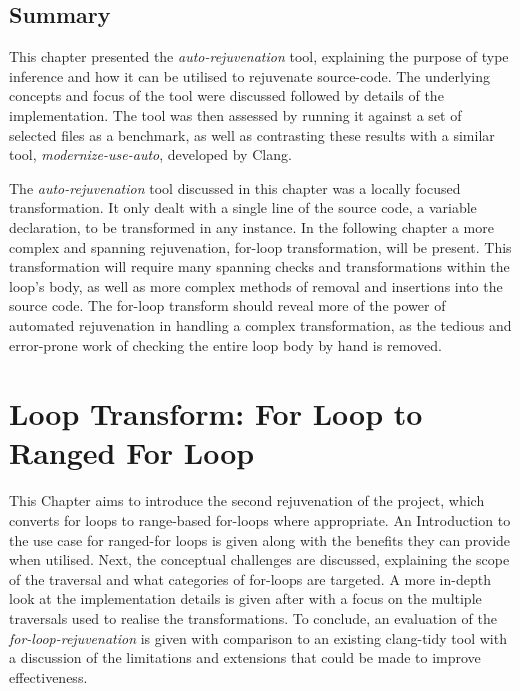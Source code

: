 \documentclass[bsc,frontabs,singlespacing,twoside,parskip,deptreport]{infthesis}
\begin{document}

\section{Summary}%
This chapter presented the \textit{auto-rejuvenation} tool, explaining the purpose of type inference and how it can be utilised to rejuvenate source-code. The underlying concepts and focus of the tool were discussed followed by details of the implementation. The tool was then assessed by running it against a set of selected files as a benchmark, as well as contrasting these results with a similar tool, \textit{modernize-use-auto}, developed by Clang. 

The \textit{auto-rejuvenation} tool discussed in this chapter was a locally focused transformation. It only dealt with a single line of the source code, a variable declaration, to be transformed in any instance. In the following chapter a more complex and spanning rejuvenation, for-loop transformation, will be present. This transformation will require many spanning checks and transformations within the loop's body, as well as more complex methods of removal and insertions into the source code. The for-loop transform should reveal more of the power of automated rejuvenation in handling a complex transformation, as the tedious and error-prone work of checking the entire loop body by hand is removed.


\chapter{Loop Transform: For Loop to Ranged For Loop}\label{chp:loop-transform}

This Chapter aims to introduce the second rejuvenation of the project, which converts for loops to range-based for-loops where appropriate. An Introduction to the use case for ranged-for loops is given along with the benefits they can provide when utilised. Next, the conceptual challenges are discussed, explaining the scope of the traversal and what categories of for-loops are targeted. A more in-depth look at the implementation details is given after with a focus on the multiple traversals used to realise the transformations. To conclude, an evaluation of the \textit{ for-loop-rejuvenation} is given with comparison to an existing clang-tidy tool with a discussion of the limitations and extensions that could be made to improve effectiveness.
\end{document}
